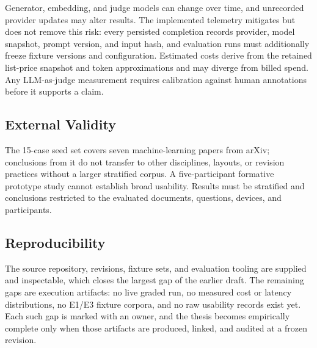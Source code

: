Generator, embedding, and judge models can change over time, and unrecorded provider updates may alter results.
The implemented telemetry mitigates but does not remove this risk: every persisted completion records provider, model snapshot, prompt version, and input hash, and evaluation runs must additionally freeze fixture versions and configuration.
Estimated costs derive from the retained list-price snapshot and token approximations and may diverge from billed spend.
Any LLM-as-judge measurement requires calibration against human annotations before it supports a claim.

\subsection{External Validity}

The 15-case seed set covers seven machine-learning papers from arXiv; conclusions from it do not transfer to other disciplines, layouts, or revision practices without a larger stratified corpus.
A five-participant formative prototype study cannot establish broad usability.
Results must be stratified and conclusions restricted to the evaluated documents, questions, devices, and participants.

\subsection{Reproducibility}

The source repository, revisions, fixture sets, and evaluation tooling are supplied and inspectable, which closes the largest gap of the earlier draft.
The remaining gaps are execution artifacts: no live graded run, no measured cost or latency distributions, no E1/E3 fixture corpora, and no raw usability records exist yet.
Each such gap is marked \pending{} with an owner, and the thesis becomes empirically complete only when those artifacts are produced, linked, and audited at a frozen revision.
